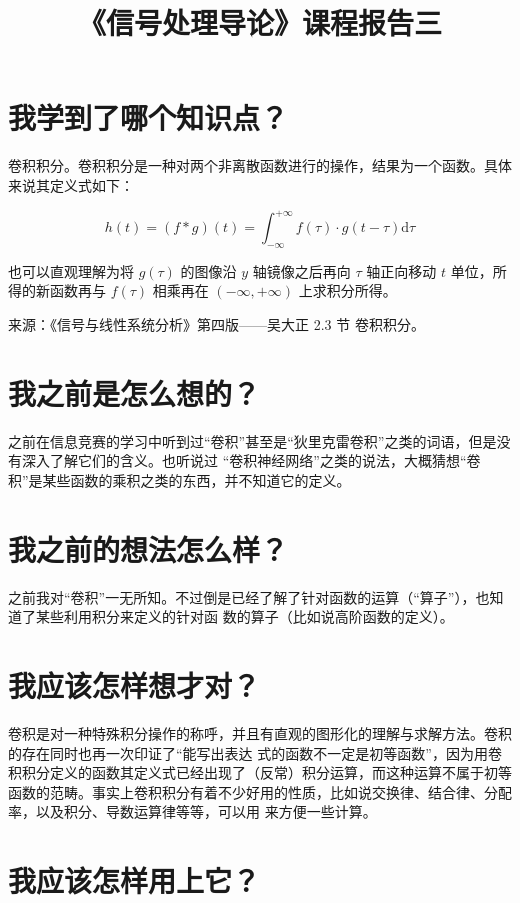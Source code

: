 \documentclass{ctexart}
\title{《信号处理导论》课程报告三}
\begin{document}
    \maketitle

    \section{我学到了哪个知识点？}

    卷积积分。卷积积分是一种对两个非离散函数进行的操作，结果为一个函数。具体来说其定义式如下：

    \[
        h(t) = (f*g)(t) = \int_{-\infty}^{+\infty} f(\tau) \cdot g(t - \tau) \mathrm{d}\tau
    \]

    也可以直观理解为将 $g(\tau)$ 的图像沿 $y$ 轴镜像之后再向 $\tau$ 轴正向移动 $t$ 单位，所得的新函数再与
    $f(\tau)$ 相乘再在 $(-\infty, +\infty)$ 上求积分所得。

    来源：《信号与线性系统分析》第四版——吴大正 2.3 节 卷积积分。

    \section{我之前是怎么想的？}

    之前在信息竞赛的学习中听到过``卷积''甚至是``狄里克雷卷积''之类的词语，但是没有深入了解它们的含义。也听说过
    ``卷积神经网络''之类的说法，大概猜想``卷积''是某些函数的乘积之类的东西，并不知道它的定义。

    \section{我之前的想法怎么样？}

    之前我对``卷积''一无所知。不过倒是已经了解了针对函数的运算（``算子''），也知道了某些利用积分来定义的针对函
    数的算子（比如说高阶函数的定义）。

    \section{我应该怎样想才对？}

    卷积是对一种特殊积分操作的称呼，并且有直观的图形化的理解与求解方法。卷积的存在同时也再一次印证了``能写出表达
    式的函数不一定是初等函数''，因为用卷积积分定义的函数其定义式已经出现了（反常）积分运算，而这种运算不属于初等
    函数的范畴。事实上卷积积分有着不少好用的性质，比如说交换律、结合律、分配率，以及积分、导数运算律等等，可以用
    来方便一些计算。

    \section{我应该怎样用上它？}
\end{document}
